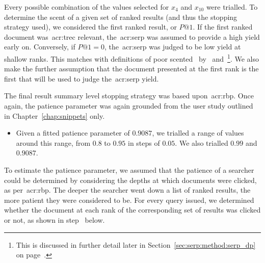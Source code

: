 Every possible combination of the values selected for $x_4$ and $x_{10}$ were trialled. To determine the scent of a given set of ranked results (and thus the stopping strategy used), we considered the first ranked result, or $P@1$. If the first ranked document was~\gls{acr:trec} relevant, the~\gls{acr:serp} was assumed to provide a high yield early on. Conversely, if $P@1=0$, the~\gls{acr:serp} was judged to be low yield at shallow ranks. This matches with definitions of poor scented~ by~\cite{wu2014information_scent} and~\cite{hassan2013serp_abandonment}\footnote{This is discussed in further detail later in Section~\ref{sec:serp:method:serp_dp} on page~\pageref{sec:serp:method:serp_dp}.}. We also make the further assumption that the document presented at the first rank is the first that will be used to judge the~\gls{acr:serp} yield.

The final result summary level stopping strategy was based upon~\gls{acr:rbp}. Once again, the patience parameter was again grounded from the user study outlined in Chapter~\ref{chap:snippets} only.

\begin{itemize}
    \item{ Given a fitted patience parameter of $0.9087$, we trialled a range of values around this range, from $0.8$ to $0.95$ in steps of $0.05$. We also trialled $0.99$ and $0.9087$.}
\end{itemize}

To estimate the patience parameter, we assumed that the patience of a searcher could be determined by considering the depths at which documents were clicked, as per~\gls{acr:rbp}. The deeper the searcher went down a list of ranked results, the more patient they were considered to be. For every query issued, we determined whether the document at each rank of the corresponding set of results was clicked or not, as shown in step~ below.

\begin{figure}[h]
    \centering
    \vspace{1mm}
    \label{fig:rbp_patience}
    \vspace{-7mm}
\end{figure}

